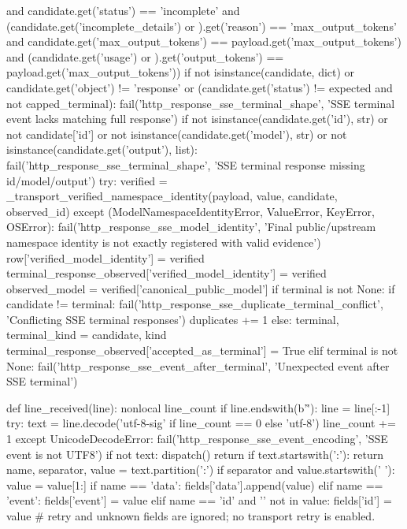 {                and candidate.get('status') == 'incomplete'
                and (candidate.get('incomplete_details') or {}).get('reason') == 'max_output_tokens'
                and candidate.get('max_output_tokens') == payload.get('max_output_tokens')
                and (candidate.get('usage') or {}).get('output_tokens') == payload.get('max_output_tokens'))
            if not isinstance(candidate, dict) or candidate.get('object') != 'response' or (candidate.get('status') != expected and not capped_terminal):
                fail('http_response_sse_terminal_shape', 'SSE terminal event lacks matching full response')
            if not isinstance(candidate.get('id'), str) or not candidate['id'] or not isinstance(candidate.get('model'), str) or not isinstance(candidate.get('output'), list):
                fail('http_response_sse_terminal_shape', 'SSE terminal response missing id/model/output')
            try:
                verified = _transport_verified_namespace_identity(payload, value, candidate, observed_id)
            except (ModelNamespaceIdentityError, ValueError, KeyError, OSError):
                fail('http_response_sse_model_identity', 'Final public/upstream namespace identity is not exactly registered with valid evidence')
            row['verified_model_identity'] = verified
            terminal_response_observed['verified_model_identity'] = verified
            observed_model = verified['canonical_public_model']
            if terminal is not None:
                if candidate != terminal:
                    fail('http_response_sse_duplicate_terminal_conflict', 'Conflicting SSE terminal responses')
                duplicates += 1
            else:
                terminal, terminal_kind = candidate, kind
                terminal_response_observed['accepted_as_terminal'] = True
        elif terminal is not None:
            fail('http_response_sse_event_after_terminal', 'Unexpected event after SSE terminal')

    def line_received(line):
        nonlocal line_count
        if line.endswith(b'\r'):
            line = line[:-1]
        try:
            text = line.decode('utf-8-sig' if line_count == 0 else 'utf-8')
            line_count += 1
        except UnicodeDecodeError:
            fail('http_response_sse_event_encoding', 'SSE event is not UTF8')
        if not text:
            dispatch()
            return
        if text.startswith(':'):
            return
        name, separator, value = text.partition(':')
        if separator and value.startswith(' '):
            value = value[1:]
        if name == 'data':
            fields['data'].append(value)
        elif name == 'event':
            fields['event'] = value
        elif name == 'id' and '' not in value:
            fields['id'] = value
        # retry and unknown fields are ignored; no transport retry is enabled.

}
